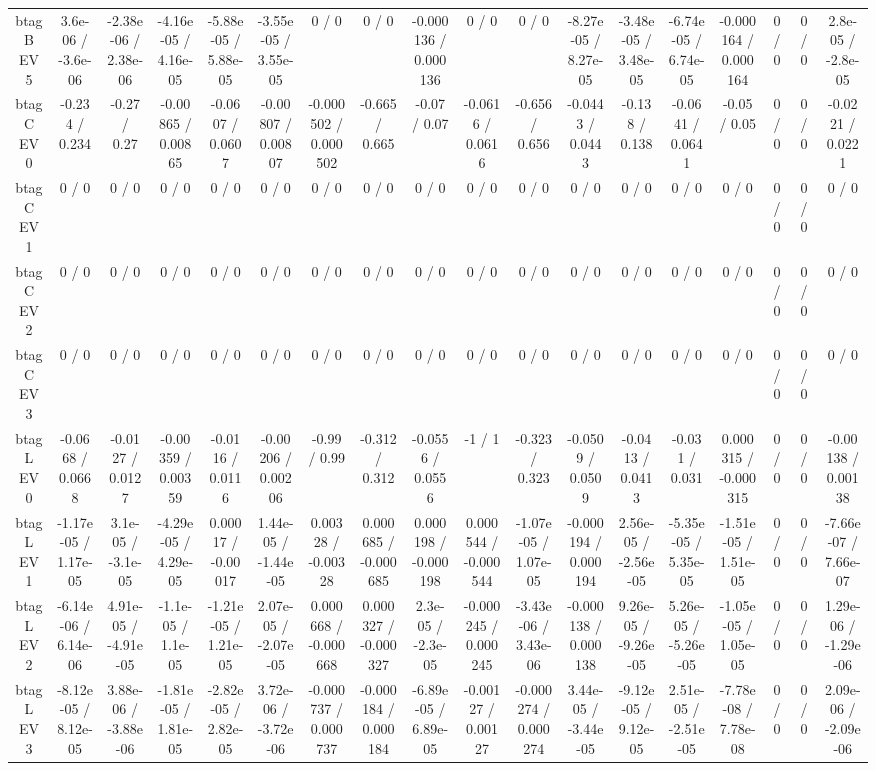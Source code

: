 \documentclass[10pt]{article}
\begin{document}
\begin{table}[htbp]
\begin{center}
\begin{tabular}{|c|c|c|c|c|c|c|c|c|c|c|c|c|c|c|c|c|c|}
  btag B EV 5 & 3.6e-06 / -3.6e-06 & -2.38e-06 / 2.38e-06 & -4.16e-05 / 4.16e-05 & -5.88e-05 / 5.88e-05 & -3.55e-05 / 3.55e-05 & 0 / 0 & 0 / 0 & -0.000136 / 0.000136 & 0 / 0 & 0 / 0 & -8.27e-05 / 8.27e-05 & -3.48e-05 / 3.48e-05 & -6.74e-05 / 6.74e-05 & -0.000164 / 0.000164 & 0 / 0 & 0 / 0 & 2.8e-05 / -2.8e-05 \\ 
  btag C EV 0 & -0.234 / 0.234 & -0.27 / 0.27 & -0.00865 / 0.00865 & -0.0607 / 0.0607 & -0.00807 / 0.00807 & -0.000502 / 0.000502 & -0.665 / 0.665 & -0.07 / 0.07 & -0.0616 / 0.0616 & -0.656 / 0.656 & -0.0443 / 0.0443 & -0.138 / 0.138 & -0.0641 / 0.0641 & -0.05 / 0.05 & 0 / 0 & 0 / 0 & -0.0221 / 0.0221 \\ 
  btag C EV 1 & 0 / 0 & 0 / 0 & 0 / 0 & 0 / 0 & 0 / 0 & 0 / 0 & 0 / 0 & 0 / 0 & 0 / 0 & 0 / 0 & 0 / 0 & 0 / 0 & 0 / 0 & 0 / 0 & 0 / 0 & 0 / 0 & 0 / 0 \\ 
  btag C EV 2 & 0 / 0 & 0 / 0 & 0 / 0 & 0 / 0 & 0 / 0 & 0 / 0 & 0 / 0 & 0 / 0 & 0 / 0 & 0 / 0 & 0 / 0 & 0 / 0 & 0 / 0 & 0 / 0 & 0 / 0 & 0 / 0 & 0 / 0 \\ 
  btag C EV 3 & 0 / 0 & 0 / 0 & 0 / 0 & 0 / 0 & 0 / 0 & 0 / 0 & 0 / 0 & 0 / 0 & 0 / 0 & 0 / 0 & 0 / 0 & 0 / 0 & 0 / 0 & 0 / 0 & 0 / 0 & 0 / 0 & 0 / 0 \\ 
  btag L EV 0 & -0.0668 / 0.0668 & -0.0127 / 0.0127 & -0.00359 / 0.00359 & -0.0116 / 0.0116 & -0.00206 / 0.00206 & -0.99 / 0.99 & -0.312 / 0.312 & -0.0556 / 0.0556 & -1 / 1 & -0.323 / 0.323 & -0.0509 / 0.0509 & -0.0413 / 0.0413 & -0.031 / 0.031 & 0.000315 / -0.000315 & 0 / 0 & 0 / 0 & -0.00138 / 0.00138 \\ 
  btag L EV 1 & -1.17e-05 / 1.17e-05 & 3.1e-05 / -3.1e-05 & -4.29e-05 / 4.29e-05 & 0.00017 / -0.00017 & 1.44e-05 / -1.44e-05 & 0.00328 / -0.00328 & 0.000685 / -0.000685 & 0.000198 / -0.000198 & 0.000544 / -0.000544 & -1.07e-05 / 1.07e-05 & -0.000194 / 0.000194 & 2.56e-05 / -2.56e-05 & -5.35e-05 / 5.35e-05 & -1.51e-05 / 1.51e-05 & 0 / 0 & 0 / 0 & -7.66e-07 / 7.66e-07 \\ 
  btag L EV 2 & -6.14e-06 / 6.14e-06 & 4.91e-05 / -4.91e-05 & -1.1e-05 / 1.1e-05 & -1.21e-05 / 1.21e-05 & 2.07e-05 / -2.07e-05 & 0.000668 / -0.000668 & 0.000327 / -0.000327 & 2.3e-05 / -2.3e-05 & -0.000245 / 0.000245 & -3.43e-06 / 3.43e-06 & -0.000138 / 0.000138 & 9.26e-05 / -9.26e-05 & 5.26e-05 / -5.26e-05 & -1.05e-05 / 1.05e-05 & 0 / 0 & 0 / 0 & 1.29e-06 / -1.29e-06 \\ 
  btag L EV 3 & -8.12e-05 / 8.12e-05 & 3.88e-06 / -3.88e-06 & -1.81e-05 / 1.81e-05 & -2.82e-05 / 2.82e-05 & 3.72e-06 / -3.72e-06 & -0.000737 / 0.000737 & -0.000184 / 0.000184 & -6.89e-05 / 6.89e-05 & -0.00127 / 0.00127 & -0.000274 / 0.000274 & 3.44e-05 / -3.44e-05 & -9.12e-05 / 9.12e-05 & 2.51e-05 / -2.51e-05 & -7.78e-08 / 7.78e-08 & 0 / 0 & 0 / 0 & 2.09e-06 / -2.09e-06 \\ 

\end{tabular}
\end{center}
\end{table}
\end{document}
